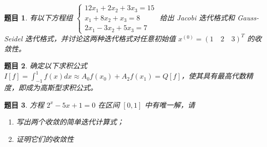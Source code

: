 \documentclass[12pt,a4paper]{article}
\newtheorem{problem}{题目}
\newcommand{\largeanswer}{\newpage\vspace*{0.5cm}\vspace{0.5cm}}
\begin{document}
    \largeanswer
    
    \begin{problem}
        有以下方程组
        $\begin{cases}
            12x_1 + 2x_2 + 3x_3 = 15 \\
            x_1 + 8x_2 + x_3 = 8 \\
            2x_1 - 3x_2 + 5x_3 = 7
        \end{cases}$
        给出 Jacobi 迭代格式和 Gauss-Seidel 迭代格式，并讨论这两种迭代格式对任意初始值 $x^{(0)} = (1 \quad 2 \quad 3)^T$ 的收敛性。
    \end{problem}
    
    \largeanswer
    
    \begin{problem}
        确定以下求积公式 $I[f] = \int_{-1}^1 f(x)dx \approx A_0f(x_0) + A_2f(x_1) = Q[f]$，使其具有最高代数精度，即成为高斯型求积公式。
    \end{problem}
    
    \largeanswer
    
    \begin{problem}
        方程 $2^x - 5x + 1 = 0$ 在区间 $[0,1]$ 中有唯一解，请
        \begin{enumerate}
            \item 写出两个收敛的简单迭代计算式；
            \item 证明它们的收敛性
        \end{enumerate}
    \end{problem}

    
\end{document}
